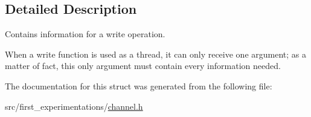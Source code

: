 \subsection{Detailed Description}
Contains information for a write operation. 

When a write function is used as a thread, it can only receive one argument; as a matter of fact, this only argument must contain every information needed. 

The documentation for this struct was generated from the following file\-:\begin{DoxyCompactItemize}
\item 
src/first\-\_\-experimentations/\hyperlink{channel_8h}{channel.\-h}\end{DoxyCompactItemize}
